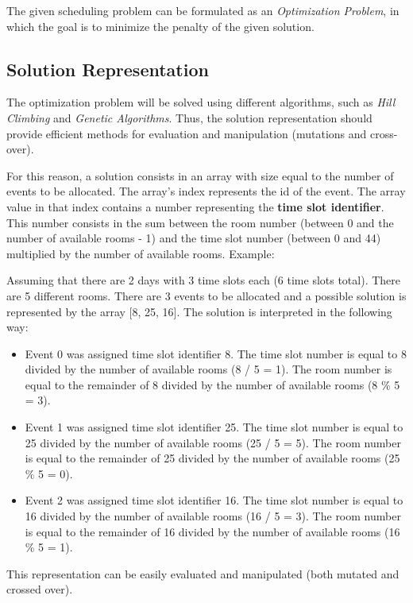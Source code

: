 \documentclass[conference]{IEEEtran}
\begin{document}
The given scheduling problem can be formulated as an \textit{Optimization Problem}, in which the goal is to minimize the penalty of the given solution.

\subsection{Solution Representation}

The optimization problem will be solved using different algorithms, such as \textit{Hill Climbing} and \textit{Genetic Algorithms}. Thus, the solution representation should provide efficient methods for evaluation and manipulation (mutations and cross-over).

For this reason, a solution consists in an array with size equal to the number of events to be allocated. The array's index represents the id of the event. The array value in that index contains a number representing the \textbf{time slot identifier}. This number consists in the sum between the room number (between 0 and the number of available rooms - 1) and the time slot number (between 0 and 44) multiplied by the number of available rooms. Example:

Assuming that there are 2 days with 3 time slots each (6 time slots total). There are 5 different rooms. There are 3 events to be allocated and a possible solution is represented by the array [8, 25, 16]. The solution is interpreted in the following way:

\begin{itemize}
    \item Event 0 was assigned time slot identifier 8. The time slot number is equal to 8 divided by the number of available rooms (8 / 5 = 1). The room number is equal to the remainder of 8 divided by the number of available rooms (8 \% 5 = 3).
    \item Event 1 was assigned time slot identifier 25. The time slot number is equal to 25 divided by the number of available rooms (25 / 5 = 5). The room number is equal to the remainder of 25 divided by the number of available rooms (25 \% 5 = 0).
    \item Event 2 was assigned time slot identifier 16. The time slot number is equal to 16 divided by the number of available rooms (16 / 5 = 3). The room number is equal to the remainder of 16 divided by the number of available rooms (16 \% 5 = 1).
\end{itemize}

This representation can be easily evaluated and manipulated (both mutated and crossed over).
\end{document}
